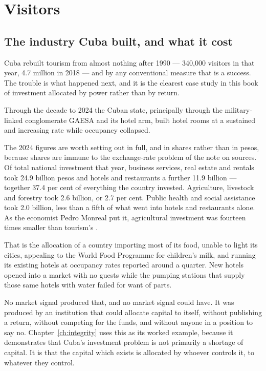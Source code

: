 \chapter{Visitors}
\label{ch:tourism}

\section{The industry Cuba built, and what it cost}

Cuba rebuilt tourism from almost nothing after 1990 --- 340,000 visitors in that
year, 4.7 million in 2018 --- and by any conventional measure that is a success.
The trouble is what happened next, and it is the clearest case study in this book
of investment allocated by power rather than by return.

Through the decade to 2024 the Cuban state, principally through the
military-linked conglomerate GAESA and its hotel arm, built hotel rooms at a
sustained and increasing rate while occupancy collapsed.

The 2024 figures are worth setting out in full, and in shares rather than in
pesos, because shares are immune to the exchange-rate problem of the note on
sources. Of total national investment that year, business services, real estate
and rentals took 24.9 billion pesos and hotels and restaurants a further 11.9
billion --- together 37.4 per cent of everything the country invested.
Agriculture, livestock and forestry took 2.6 billion, or 2.7 per cent. Public
health and social assistance took 2.0 billion, less than a fifth of what went
into hotels and restaurants alone. As the economist Pedro Monreal put it,
agricultural investment was fourteen times smaller than tourism's
\citep{oneiinv}.\unv{}

That is the allocation of a country importing most of its food, unable to light
its cities, appealing to the World Food Programme for children's milk, and
running its existing hotels at occupancy rates reported around a quarter. New
hotels opened into a market with no guests while the pumping stations that
supply those same hotels with water failed for want of parts.

No market signal produced that, and no market signal could have. It was
produced by an institution that could
allocate capital to itself, without publishing a return, without competing for
the funds, and without anyone in a position to say no. Chapter~\ref{ch:integrity}
uses this as its worked example, because it demonstrates that Cuba's investment
problem is not primarily a shortage of capital. It is that the capital which
exists is allocated by whoever controls it, to whatever they control.

